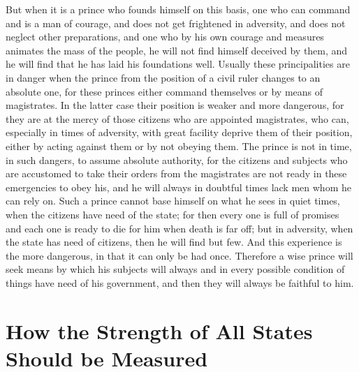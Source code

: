 \documentclass[12pt,letterpaper]{memoir}
\begin{document}
But when it is a prince who founds himself on this basis, one who
can command and is a man of courage, and does not get frightened in
adversity, and does not neglect other preparations, and one who by his
own courage and measures animates the mass of the people, he will not
find himself deceived by them, and he will find that he has laid his
foundations well. Usually these principalities are in danger when the
prince from the position of a civil ruler changes to an absolute one,
for these princes either command themselves or by means of magistrates.
In the latter case their position is weaker and more dangerous, for
they are at the mercy of those citizens who are appointed magistrates,
who can, especially in times of adversity, with great facility deprive
them of their position, either by acting against them or by not obeying
them. The prince is not in time, in such dangers, to assume absolute
authority, for the citizens and subjects who are accustomed to take
their orders from the magistrates are not ready in these emergencies
to obey his, and he will always in doubtful times lack men whom he can
rely on. Such a prince cannot base himself on what he sees in quiet
times, when the citizens have need of the state; for then every one is
full of promises and each one is ready to die for him when death is
far off; but in adversity, when the state has need of citizens, then
he will find but few. And this experience is the more dangerous, in
that it can only be had once. Therefore a wise prince will seek means
by which his subjects will always and in every possible condition
of things have need of his government, and then they will always be
faithful to him.

\chapter{How the Strength of All States Should be Measured}
\end{document}
